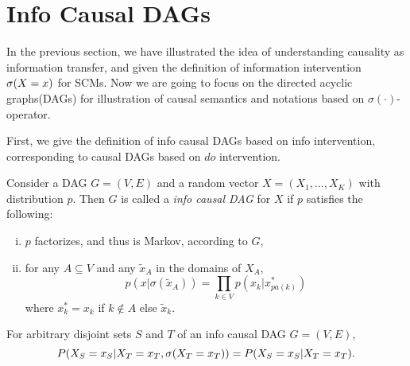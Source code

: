 

\section{Info Causal DAGs}

In the previous section, we have illustrated the idea of understanding causality as information transfer, and given the definition of information intervention $\mathrm{\sigma}(X =x)$ for SCMs. Now we are going to focus on the directed acyclic graphs(DAGs) for illustration of causal semantics and notations based on $\sigma(\cdot)$-operator.

First, we give the definition of info causal DAGs based on info intervention, corresponding to causal DAGs based on $do$ intervention.

\begin{Def}
	Consider a DAG $G = (V, E)$ and a random vector $X = (X_1, ..., X_K)$ with distribution $p$. Then $G$ is called a \emph{info causal DAG} for $X$ if $p$ satisfies the following:
	\begin{enumerate}[(i)]
		\setlength{\itemsep}{0pt}
		\item $p$ factorizes, and thus is Markov, according to $G$,  
		\item for any $A \subseteq V$ and any $\tilde{x}_A$ in the domains of $X_A$,
		\begin{equation}\label{eq:sigma}
			p(x| \sigma(\tilde{x}_A)) = \prod_{k \in V} p(x_k|x_{pa(k)}^*)
		\end{equation}		
		where $x^*_k = x_k$ if $k \notin A$ else $\tilde{x}_k$.
	\end{enumerate}
\end{Def}



\begin{Lem}
	\label{Lem:consistent}
	For arbitrary disjoint sets  $S$ and $T$ of an info causal DAG $G = (V, E)$,  
	$$
	P(X_S=x_S|X_T=x_T, \mathrm{\sigma}(X_T=x_T)) = P(X_S=x_S|X_T=x_T).
	$$
\end{Lem}

